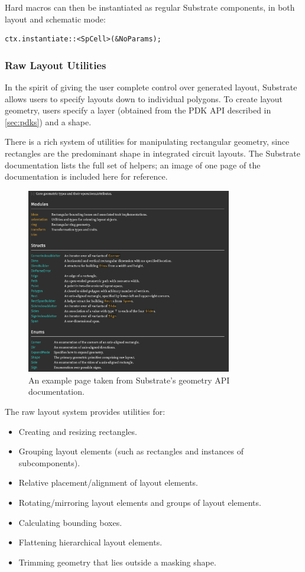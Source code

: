 Hard macros can then be instantiated as regular Substrate components, in both layout and schematic mode:
\begin{verbatim}
ctx.instantiate::<SpCell>(&NoParams);
\end{verbatim}

\subsubsection{Raw Layout Utilities}

In the spirit of giving the user complete control over generated layout, Substrate allows users to
specify layouts down to individual polygons. To create layout geometry, users specify a layer
(obtained from the PDK API described in \ref{sec:pdks}) and a shape.

There is a rich system of utilities for manipulating rectangular geometry, since rectangles are the
predominant shape in integrated circuit layouts. The Substrate documentation lists the full set of
helpers; an image of one page of the documentation is included here for reference.

\begin{figure}[htb] \centering
\includegraphics[width=0.8\textwidth]{figures/subgeom.png}
\caption{
    An example page taken from Substrate's geometry API documentation.
}
\end{figure}


The raw layout system provides utilities for:
\begin{itemize}
\item Creating and resizing rectangles.
\item Grouping layout elements (such as rectangles and instances of subcomponents).
\item Relative placement/alignment of layout elements.
\item Rotating/mirroring layout elements and groups of layout elements.
\item Calculating bounding boxes.
\item Flattening hierarchical layout elements.
\item Trimming geometry that lies outside a masking shape.
\end{itemize}

